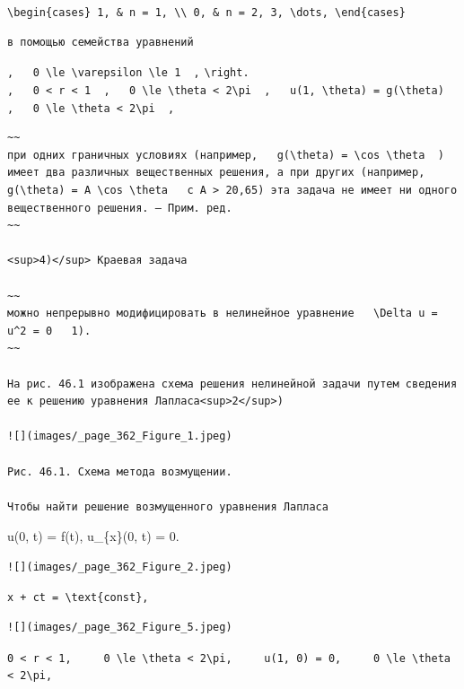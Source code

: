 \documentclass[
  ukrainian,
]{article}
\begin{document}
\texttt{\textbackslash{}begin\{cases\}\ 1,\ \&\ n\ =\ 1,\ \textbackslash{}\textbackslash{}\ 0,\ \&\ n\ =\ 2,\ 3,\ \textbackslash{}dots,\ \textbackslash{}end\{cases\}}

\begin{verbatim}
в помощью семейства уравнений
\end{verbatim}

\texttt{,\ \ \ 0\ \textbackslash{}le\ \textbackslash{}varepsilon\ \textbackslash{}le\ 1\ \ ,}
\texttt{\textbackslash{}right.}
\texttt{,\ \ \ 0\ \textless{}\ r\ \textless{}\ 1\ \ ,\ \ \ 0\ \textbackslash{}le\ \textbackslash{}theta\ \textless{}\ 2\textbackslash{}pi\ \ ,\ \ \ u(1,\ \textbackslash{}theta)\ =\ g(\textbackslash{}theta)\ \ ,\ \ \ 0\ \textbackslash{}le\ \textbackslash{}theta\ \textless{}\ 2\textbackslash{}pi\ \ ,}

\begin{verbatim}
~~
при одних граничных условиях (например,   g(\theta) = \cos \theta  ) имеет два различных вещественных решения, а при других (например,   g(\theta) = A \cos \theta   с A > 20,65) эта задача не имеет ни одного вещественного решения. — Прим. ред.
~~

<sup>4)</sup> Краевая задача

~~
можно непрерывно модифицировать в нелинейное уравнение   \Delta u = u^2 = 0   1).
~~

На рис. 46.1 изображена схема решения нелинейной задачи путем сведения ее к решению уравнения Лапласа<sup>2</sup>)

![](images/_page_362_Figure_1.jpeg)

Рис. 46.1. Схема метода возмущении.

Чтобы найти решение возмущенного уравнения Лапласа
\end{verbatim}

u(0, t) = f(t), u\_\{x\}(0, t) = 0.

\begin{verbatim}
![](images/_page_362_Figure_2.jpeg)
\end{verbatim}

\texttt{x\ +\ ct\ =\ \textbackslash{}text\{const\},}

\begin{verbatim}
![](images/_page_362_Figure_5.jpeg)
\end{verbatim}

\texttt{0\ \textless{}\ r\ \textless{}\ 1,\ \ \ \ \ 0\ \textbackslash{}le\ \textbackslash{}theta\ \textless{}\ 2\textbackslash{}pi,\ \ \ \ \ u(1,\ 0)\ =\ 0,\ \ \ \ \ 0\ \textbackslash{}le\ \textbackslash{}theta\ \textless{}\ 2\textbackslash{}pi,}
\end{document}
